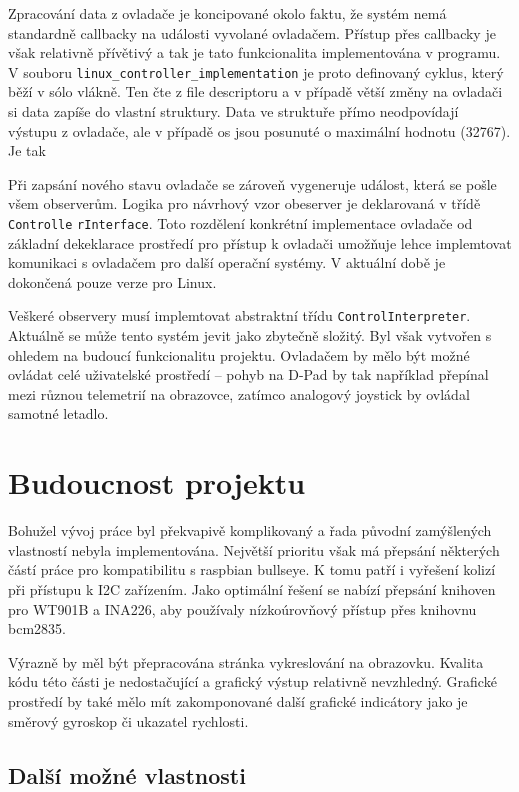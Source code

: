 \documentclass[a4paper,oneside,12pt]{report}
\begin{document}
Zpracování data z ovladače je koncipované okolo faktu, že systém nemá standardně callbacky na události vyvolané ovladačem.
Přístup přes callbacky je však relativně přívětivý a tak je tato funkcionalita implementována v programu.
V souboru \verb|linux_controller_implementation| je proto definovaný cyklus, který běží v sólo vlákně.
Ten čte z file descriptoru a v případě větší změny na ovladači si data zapíše do vlastní struktury.
Data ve struktuře přímo neodpovídají výstupu z ovladače, ale v případě os jsou posunuté o maximální hodnotu (32767).
Je tak

Při zapsání nového stavu ovladače se zároveň vygeneruje událost, která se pošle všem observerům.
Logika pro návrhový vzor obeserver je deklarovaná v třídě \verb|Controlle|
\verb|rInterface|.
Toto rozdělení konkrétní implementace ovladače od základní dekeklarace prostředí pro přístup k ovladači umožňuje lehce implemtovat komunikaci s ovladačem pro další operační systémy.
V aktuální době je dokončená pouze verze pro Linux.

Veškeré observery musí implemtovat abstraktní třídu \verb|ControlInterpreter|.
Aktuálně se může  tento systém jevit jako zbytečně složitý.
Byl však vytvořen s ohledem na budoucí funkcionalitu projektu.
Ovladačem by mělo být možné ovládat celé uživatelské prostředí -- pohyb na D-Pad by tak například přepínal mezi různou telemetrií na obrazovce, zatímco analogový joystick by ovládal samotné letadlo.

\chapter{Budoucnost projektu}

Bohužel vývoj práce byl překvapivě komplikovaný a řada původní zamýšlených vlastností nebyla implementována.
Největší prioritu však má přepsání některých částí práce pro kompatibilitu s raspbian bullseye.
K tomu patří i vyřešení kolizí při přístupu k I2C zařízením.
Jako optimální řešení se nabízí přepsání knihoven pro WT901B a INA226, aby používaly nízkoúrovňový přístup přes knihovnu bcm2835.

Výrazně by měl být přepracována stránka vykreslování na obrazovku.
Kvalita kódu této části je nedostačující a grafický výstup relativně nevzhledný.
Grafické prostředí by také mělo mít zakomponované další grafické indicátory jako je směrový gyroskop či ukazatel rychlosti.

\section{Další možné vlastnosti}
\end{document}
